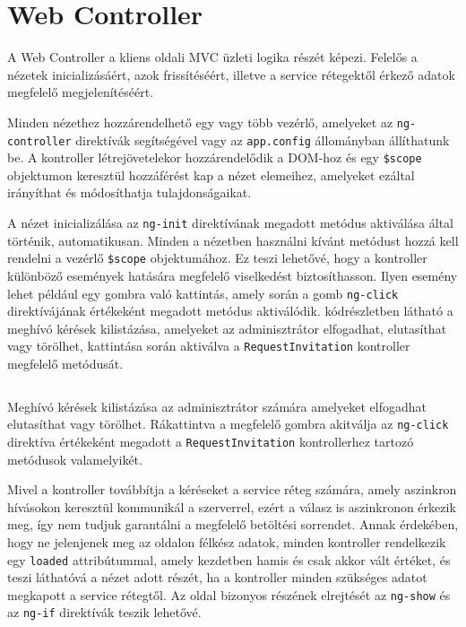 \section{Web Controller}
\label{sec:webController}
A Web Controller a kliens oldali MVC üzleti logika részét képezi. Felelős a nézetek inicializásáért, azok frissítéséért, illetve a service rétegektől érkező adatok megfelelő megjelenítéséért. 

Minden nézethez hozzárendelhető egy vagy több vezérlő, amelyeket az \texttt{ng-controller} direktívák segítségével vagy az \texttt{app.config} állományban állíthatunk be. A kontroller létrejövetelekor hozzárendelődik a DOM-hoz és egy \texttt{\$scope} objektumon keresztül hozzáférést kap a nézet elemeihez, amelyeket ezáltal irányíthat és módosíthatja tulajdonságaikat. 

A nézet inicializálása az \texttt{ng-init} direktívának megadott metódus aktiválása által történik, automatikusan. Minden a nézetben használni kívánt metódust hozzá kell rendelni a vezérlő \texttt{\$scope}  objektumához. Ez teszi lehetővé, hogy a kontroller különböző események hatására megfelelő viselkedést biztosíthasson. Ilyen esemény lehet például egy gombra való kattintás, amely során a gomb \texttt{ng-click} direktívájának értékeként megadott metódus aktiválódik.  kódrészletben látható a meghívó kérések kilistázása, amelyeket az adminisztrátor elfogadhat, elutasíthat vagy törölhet, kattintása során aktiválva a \texttt{RequestInvitation} kontroller megfelelő metódusát.

\begin{listing}
  \inputminted[fontsize=\small]{html}{progfiles/ngClick.html}
  \caption{Meghívó kérések kilistázása az adminisztrátor számára\protect{,} amelyeket elfogadhat\protect{,} elutasíthat vagy törölhet. Rákattintva a megfelelő gombra akitválja az \texttt{ng-click} direktíva értékeként megadott\protect{,} a \texttt{RequestInvitation} kontrollerhez tartozó metódusok valamelyikét.}
  \label{lst:ngClick}
\end{listing}

Mivel a kontroller továbbítja a kéréseket a service réteg számára, amely aszinkron hívásokon keresztül kommunikál a szerverrel, ezért a válasz is aszinkronon érkezik meg, így nem tudjuk garantálni a megfelelő betöltési sorrendet. Annak érdekében, hogy ne jelenjenek meg az oldalon félkész adatok, minden kontroller rendelkezik egy \texttt{loaded} attribútummal, amely kezdetben hamis és csak akkor vált értéket, és teszi láthatóvá a nézet adott részét, ha a kontroller minden szükséges adatot megkapott a service rétegtől. Az oldal bizonyos részének elrejtését az  \texttt{ng-show} és az \texttt{ng-if} direktívák teszik lehetővé. 

